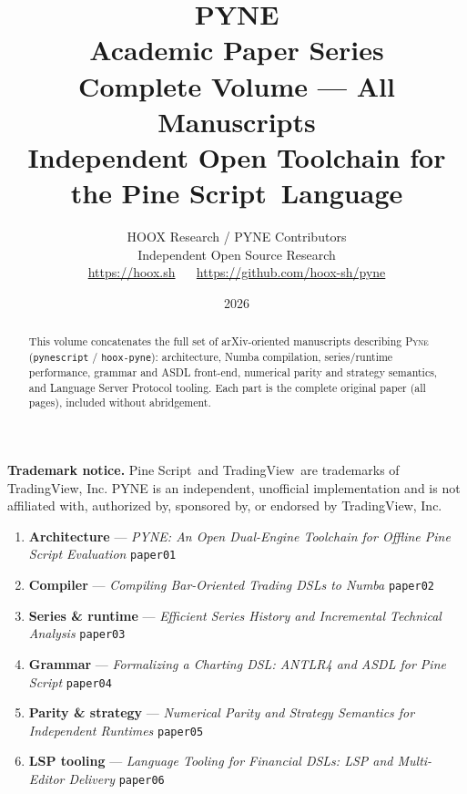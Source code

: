 \documentclass[11pt,a4paper]{article}
\title{%
  \vspace*{1.5cm}
  {\Large\textcolor{pyneorange}{\textbf{PYNE}}}\\[0.6em]
  {\LARGE\bfseries Academic Paper Series}\\[0.4em]
  {\large Complete Volume --- All Manuscripts}\\[1.2em]
  {\normalsize Independent Open Toolchain for the Pine Script\texttrademark\ Language}
}
\author{%
  HOOX Research / PYNE Contributors\\[0.3em]
  \small Independent Open Source Research\\
  \small \url{https://hoox.sh}
  ~\textperiodcentered~
  \url{https://github.com/hoox-sh/pyne}
}
\date{2026}
\begin{document}
\maketitle
\thispagestyle{empty}

\begin{abstract}
\noindent
This volume concatenates the full set of arXiv-oriented manuscripts describing
\textsc{Pyne} (\texttt{pynescript} / \texttt{hoox-pyne}): architecture, Numba
compilation, series/runtime performance, grammar and ASDL front-end, numerical
parity and strategy semantics, and Language Server Protocol tooling.
Each part is the complete original paper (all pages), included without abridgement.
\end{abstract}

\vspace{0.8em}
\noindent\textbf{Trademark notice.}
Pine Script\texttrademark\ and TradingView\textregistered\ are trademarks of
TradingView, Inc. PYNE is an independent, unofficial implementation and is not
affiliated with, authorized by, sponsored by, or endorsed by TradingView, Inc.

\vspace{1.2em}
\begin{tcolorbox}[
  colback=pyneblue!4,
  colframe=pyneblue!55!black,
  title=\textbf{Volume contents},
  fonttitle=\bfseries,
  boxrule=0.6pt,
  arc=2pt,
  left=4pt,right=4pt,top=2pt,bottom=2pt
]
\begin{enumerate}[leftmargin=1.6em,itemsep=0.45em]
  \item \textbf{Architecture} ---
    \emph{PYNE: An Open Dual-Engine Toolchain for Offline Pine Script Evaluation}
    \hfill {\small\texttt{paper01}}
  \item \textbf{Compiler} ---
    \emph{Compiling Bar-Oriented Trading DSLs to Numba}
    \hfill {\small\texttt{paper02}}
  \item \textbf{Series \& runtime} ---
    \emph{Efficient Series History and Incremental Technical Analysis}
    \hfill {\small\texttt{paper03}}
  \item \textbf{Grammar} ---
    \emph{Formalizing a Charting DSL: ANTLR4 and ASDL for Pine Script}
    \hfill {\small\texttt{paper04}}
  \item \textbf{Parity \& strategy} ---
    \emph{Numerical Parity and Strategy Semantics for Independent Runtimes}
    \hfill {\small\texttt{paper05}}
  \item \textbf{LSP tooling} ---
    \emph{Language Tooling for Financial DSLs: LSP and Multi-Editor Delivery}
    \hfill {\small\texttt{paper06}}
\end{enumerate}
\end{tcolorbox}
\end{document}

